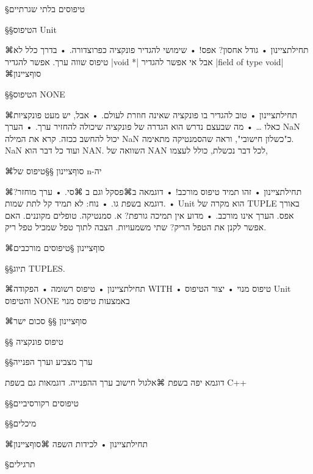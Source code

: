 §טיפוסים בלתי שגרתיים

§§הטיפוס Unit

⌘תחילת{ציינון}
• גודל אחסון? אפס!
• שימושי להגדיר פונקציה כפרוצדורה.
• בדרך כלל לא טיפוס שווה ערך. אפשר להגדיר
\E|void *| אבל אי אפשר להגדיר
\E|field of type void|
⌘סוף{ציינון}

§§הטיפוס NONE

⌘תחילת{ציינון}
• טוב להגדיר בו פונקציה שאינה חוזרת לעולם.
• אבל, יש מעט פונקציות כאלו \ldots
• מה שבעצם נדרש הוא הגדרה של פונקציה שיכולה להחזיר ערך.
• הערך NaN יכול להחשב ככזה. קרא את המילה NaN כ"כשלון חישובי", וראה
שהסמנטיקה מתאימה. NaN ועוד כל דבר הוא NAN. השוואה של NAN לכל דבר נכשלת,
כולל
לעצמו,

⌘סוף{ציינון}
§§טיפוס של n-יה

⌘תחילת{ציינון}
• זהו תמיד טיפוס מורכב!
• דוגמאה ב⌘פסקל וגם ב ⌘סי.
• ערך מוחזר? דוגמא בשפת גו.
• נוח: לא תמיד קל לתת שמות.
• Unit הוא מקרה של TUPLE באורך אפס. הערך אינו מורכב.
• מדוע אין תמיכה גורפת? א. סמנטיקה. טופלים מקוננים. האם אפשר לקנן את הטפל
הריק? שתי משמעויות. הצבה לתוך טפל שמכיל טפל ריק.

⌘סוף{ציינון}
§טיפוסים מורכבים

§§תיוג TUPLES.

⌘תחילת{ציינון}
• טיפוס רשומה
• הפקודה WITH
• טיפוס מנוי
• יצור הטיפוס Unit והטיפוס NONE באמצעות טיפוס מנוי

⌘סוף{ציינון}
§§ סכום ישר

§§ טיפוס פונקציה

§§ערך מצביע וערך הפנייה

דוגמא יפה בשפת
⌘אלגול
חישוב ערך ההפנייה.
דוגמאות גם בשפת C++

§§טיפוסים רקורסיביים

§§מיכלים

⌘תחילת{ציינון}
•
לכידות השפה
⌘סוף{ציינון}

§תרגילים




